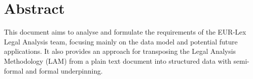 \section*{Abstract}
This document aims to analyse and formulate the requirements of the
EUR-Lex Legal Analysis team, focusing mainly on the data model and potential future applications. It also provides an approach for transposing the Legal Analysis Methodology (LAM) from a plain text document into structured data with semi-formal and formal underpinning.